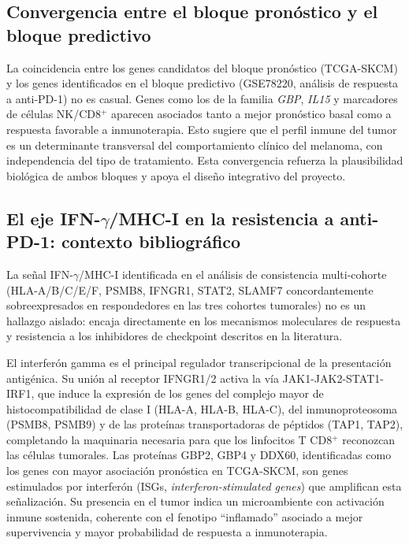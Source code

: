 \subsection{Convergencia entre el bloque pronóstico y el bloque predictivo}

La coincidencia entre los genes candidatos del bloque pronóstico (TCGA-SKCM) y los genes identificados en el bloque predictivo (GSE78220, análisis de respuesta a anti-PD-1) no es casual. Genes como los de la familia \textit{GBP}, \textit{IL15} y marcadores de células NK/CD8$^+$ aparecen asociados tanto a mejor pronóstico basal como a respuesta favorable a inmunoterapia. Esto sugiere que el perfil inmune del tumor es un determinante transversal del comportamiento clínico del melanoma, con independencia del tipo de tratamiento. Esta convergencia refuerza la plausibilidad biológica de ambos bloques y apoya el diseño integrativo del proyecto.

\subsection{El eje \texorpdfstring{IFN-$\gamma$/MHC-I}{IFN-gamma/MHC-I} en la resistencia a anti-PD-1: contexto bibliográfico}

La señal IFN-$\gamma$/MHC-I identificada en el análisis de consistencia multi-cohorte (HLA-A/B/C/E/F, PSMB8, IFNGR1, STAT2, SLAMF7 concordantemente sobreexpresados en respondedores en las tres cohortes tumorales) no es un hallazgo aislado: encaja directamente en los mecanismos moleculares de respuesta y resistencia a los inhibidores de checkpoint descritos en la literatura.

El interferón gamma es el principal regulador transcripcional de la presentación antigénica. Su unión al receptor IFNGR1/2 activa la vía JAK1-JAK2-STAT1-IRF1, que induce la expresión de los genes del complejo mayor de histocompatibilidad de clase I (HLA-A, HLA-B, HLA-C), del inmunoproteosoma (PSMB8, PSMB9) y de las proteínas transportadoras de péptidos (TAP1, TAP2), completando la maquinaria necesaria para que los linfocitos T CD8$^+$ reconozcan las células tumorales. Las proteínas GBP2, GBP4 y DDX60, identificadas como los genes con mayor asociación pronóstica en TCGA-SKCM, son genes estimulados por interferón (ISGs, \textit{interferon-stimulated genes}) que amplifican esta señalización. Su presencia en el tumor indica un microambiente con activación inmune sostenida, coherente con el fenotipo ``inflamado'' asociado a mejor supervivencia y mayor probabilidad de respuesta a inmunoterapia.

